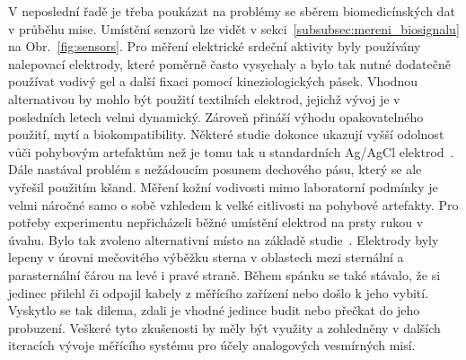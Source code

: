 V neposlední řadě je třeba poukázat na problémy se sběrem biomedicínských dat v
průběhu mise. Umístění senzorů lze vidět v
sekci~\ref{subsubsec:mereni_biosignalu} na Obr.~\ref{fig:sensors}. Pro měření
elektrické srdeční aktivity byly používány nalepovací elektrody, které poměrně
často vysychaly a bylo tak nutné dodatečně používat vodivý gel a další fixaci
pomocí kineziologických pásek. Vhodnou alternativou by mohlo být použití
textilních elektrod, jejichž vývoj je v posledních letech velmi dynamický.
Zároveň přináší výhodu opakovatelného použití, mytí a biokompatibility. Některé
studie dokonce ukazují vyšší odolnost vůči pohybovým artefaktům než je tomu tak
u standardních Ag/AgCl elektrod~\cite{Nigusse2020,Nigusse2021}. Dále nastával
problém s nežádoucím posunem dechového pásu, který se ale vyřešil použitím
kšand. Měření kožní vodivosti mimo laboratorní podmínky je velmi náročné samo o
sobě vzhledem k velké citlivosti na pohybové artefakty. Pro potřeby experimentu
nepřicházeli běžné umístění elektrod na prsty rukou v úvahu. Bylo tak zvoleno
alternativní místo na základě studie~\cite{Janssen2012}. Elektrody byly lepeny v
úrovni mečovitého výběžku sterna v oblastech mezi sternální a parasternální
čárou na levé i pravé straně. Během spánku se také stávalo, že si jedinec
přilehl či odpojil kabely z měřícího zařízení nebo došlo k jeho vybití. Vyskytlo
se tak dilema, zdali je vhodné jedince budit nebo přečkat do jeho probuzení.
Veškeré tyto zkušenosti by měly být využity a zohledněny v dalších iteracích
vývoje měřícího systému pro účely analogových vesmírných misí.

